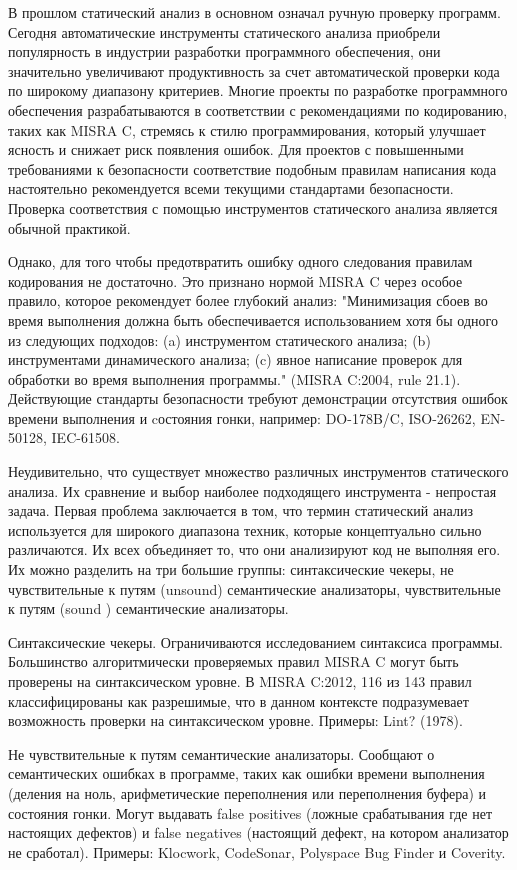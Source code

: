 
{\actuality} В прошлом статический анализ в основном означал ручную проверку 
программ. Сегодня автоматические инструменты статического анализа приобрели 
популярность в индустрии разработки программного обеспечения, они 
значительно увеличивают продуктивность за счет автоматической проверки кода по
широкому диапазону критериев. Многие проекты по разработке программного обеспечения 
разрабатываются в соответствии с рекомендациями по кодированию,
таких как MISRA C\cite{Misrac1998}, стремясь к стилю программирования, 
который улучшает ясность и снижает риск появления ошибок. Для проектов с
повышенными требованиями к безопасности соответствие подобным правилам написания
кода настоятельно рекомендуется всеми текущими стандартами безопасности.
Проверка соответствия с помощью инструментов статического анализа является обычной 
практикой.

Однако, для того чтобы предотвратить ошибку одного следования правилам кодирования
не достаточно. Это признано нормой MISRA C через особое правило,
которое рекомендует более глубокий анализ: "Минимизация сбоев во время выполнения 
должна быть обеспечивается использованием хотя бы одного из следующих подходов: 
(a) инструментом статического анализа; (b) инструментами динамического анализа;
(c) явное написание проверок для обработки во время выполнения программы." 
(MISRA C:2004, rule 21.1). Действующие стандарты безопасности требуют демонстрации
отсутствия ошибок времени выполнения и cостояния гонки, например: DO-178B/C, ISO-26262,
EN-50128, IEC-61508.

Неудивительно, что существует множество различных инструментов статического анализа.
Их сравнение и выбор наиболее подходящего инструмента - непростая задача. 
Первая проблема заключается в том, что термин статический анализ используется 
для широкого диапазона техник, которые концептуально сильно различаются.
Их всех объединяет то, что они анализируют код не выполняя его. Их можно
разделить на три большие группы: синтаксические чекеры, не чувствительные к путям 
(unsound) семантические анализаторы, чувствительные к путям (sound ) семантические 
анализаторы. 

Синтаксические чекеры. Ограничиваются исследованием синтаксиса программы. 
Большинство алгоритмически проверяемых правил MISRA C могут быть проверены 
на синтаксическом уровне. В MISRA C:2012, 116 из 143 правил классифицированы 
как разрешимые, что в данном контексте подразумевает возможность проверки 
на синтаксическом уровне. Примеры: Lint? (1978). 

Не чувствительные к путям семантические анализаторы. Сообщают о семантических ошибках 
в программе, таких как ошибки времени выполнения (деления на ноль, арифметические переполнения
или переполнения буфера) и состояния гонки. Могут выдавать false positives
(ложные срабатывания  где нет настоящих дефектов) и false negatives (настоящий дефект, на котором
анализатор не сработал). Примеры: Klocwork\cite{Klocwork}, 
CodeSonar\cite{Codesonar}, Polyspace Bug Finder\cite{Polyspace}
и Coverity\cite{Coverity}.

